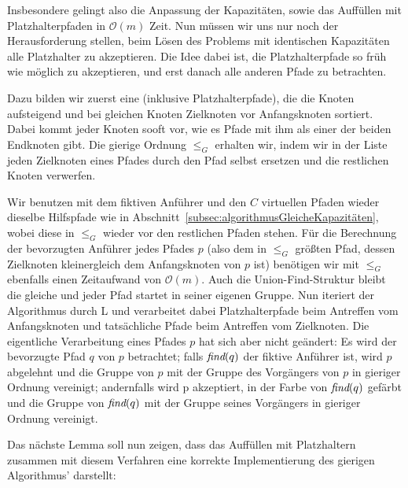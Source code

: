 Insbesondere gelingt also die Anpassung der Kapazitäten, sowie das Auffüllen mit Platzhalterpfaden in $\mathcal O(m)$ Zeit.
Nun müssen wir uns nur noch der Herausforderung stellen, beim Lösen des Problems mit identischen Kapazitäten alle
Platzhalter zu akzeptieren.
Die Idee dabei ist, die Platzhalterpfade so früh wie möglich zu akzeptieren, und erst danach alle anderen Pfade zu
betrachten.

Dazu bilden wir zuerst eine  (inklusive Platzhalterpfade), die die Knoten
aufsteigend und bei gleichen Knoten Zielknoten vor Anfangsknoten sortiert.
Dabei kommt jeder Knoten sooft vor, wie es Pfade mit ihm als einer der beiden Endknoten gibt.
Die gierige Ordnung $\leq_{G}$ erhalten wir, indem wir in der Liste jeden Zielknoten eines Pfades durch den Pfad selbst
ersetzen und die restlichen Knoten verwerfen.

Wir benutzen mit dem fiktiven Anführer und den $C$ virtuellen Pfaden wieder dieselbe Hilfspfade wie in
Abschnitt~\ref{subsec:algorithmusGleicheKapazitäten}, wobei diese in $\leq_G$ wieder vor den restlichen Pfaden stehen.
Für die Berechnung der bevorzugten Anführer jedes Pfades $p$ (also dem in $\leq_G$ größten Pfad, dessen
Zielknoten kleinergleich dem Anfangsknoten von $p$ ist) benötigen wir mit $\leq_G$ ebenfalls einen Zeitaufwand von
$\mathcal O(m)$.
Auch die Union-Find-Struktur bleibt die gleiche und jeder Pfad startet in seiner eigenen Gruppe.
Nun iteriert der Algorithmus durch L und verarbeitet dabei Platzhalterpfade beim Antreffen vom
Anfangsknoten und tatsächliche Pfade beim Antreffen vom Zielknoten.
Die eigentliche Verarbeitung eines Pfades $p$ hat sich aber nicht geändert: Es wird der bevorzugte Pfad $q$ von $p$
betrachtet;
falls $\text{\em find}(q)$ der fiktive Anführer ist, wird $p$ abgelehnt und die Gruppe von $p$ mit der
Gruppe des Vorgängers von $p$ in gieriger Ordnung vereinigt;
andernfalls wird p akzeptiert, in der Farbe von $\text{\em find}(q)$
gefärbt und die Gruppe von $\text{\em find}(q)$ mit der Gruppe seines Vorgängers in gieriger Ordnung vereinigt.

Das nächste Lemma soll nun zeigen, dass das Auffüllen mit Platzhaltern zusammen mit diesem Verfahren eine korrekte
Implementierung des gierigen Algorithmus' darstellt:


